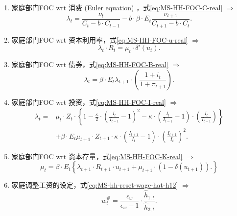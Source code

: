 \begin{enumerate}
\item 家庭部门FOC wrt 消费 (Euler equation) ，式\eqref{eq:MS-HH-FOC-C-real} $\Rightarrow$
\begin{equation*}
\lambda_t = \frac{\nu_t}{C_t - b \cdot C_{t-1}} - b \cdot \beta \cdot E_t \frac{\nu_{t+1}}{C_{t+1} - b \cdot C_{t}}.
\end{equation*}

\item 家庭部门FOC wrt 资本利用率，式\eqref{eq:MS-HH-FOC-u-real} $\Rightarrow$
\begin{equation*}
\lambda_t \cdot R_t = \mu_t \cdot \delta'(u_t).
\end{equation*}

\item 家庭部门FOC wrt 债券，式\eqref{eq:MS-HH-FOC-B-real} $\Rightarrow$
\begin{equation*}
\lambda_t = \beta \cdot E_{t} \lambda_{t+1} \cdot \left(\frac{1+i_t}{1+\pi_{t+1}}\right).
\end{equation*}

\item 家庭部门FOC wrt 投资，式\eqref{eq:MS-HH-FOC-I-real} $\Rightarrow$
\begin{equation*}
\begin{split}
\lambda_t = &\mu_t \cdot Z_t \cdot \left\{
  1 - \frac{\kappa}{2} \cdot \left(\frac{I_t}{I_{t-1}} -1\right)^2 - \kappa \cdot \left(\frac{I_t}{I_{t-1}} -1 \right) \cdot \left(\frac{I_t}{I_{t-1}} \right)
\right\} \\
&+ \beta \cdot E_t \mu_{t+1} \cdot Z_{t+1} \cdot \kappa \cdot \left(\frac{I_{t+1}}{I_{t}} -1 \right) \cdot \left(\frac{I_{t+1}}{I_{t}}\right)^2.
\end{split}
\end{equation*}

\item 家庭部门FOC wrt 资本存量，式\eqref{eq:MS-HH-FOC-K-real} $\Rightarrow$
\begin{equation*}
\mu_t = \beta \cdot E_t \left\{
  \lambda_{t+1} \cdot R_{t+1} \cdot u_{t+1} + \mu_{t+1} \cdot \left(1-\delta(u_{t+1})\right).
\right\}
\end{equation*}

\item 家庭调整工资的设定，式\eqref{eq:MS-hh-reset-wage-hat-h12} $\Rightarrow$
\begin{equation*}
w^{\#}_t = \frac{\epsilon_w}{\epsilon_w -1} \cdot \frac{
  \hat{h}_{1,t}
}{
  \hat{h}_{2,t}
}.
\end{equation*}


\end{enumerate}
